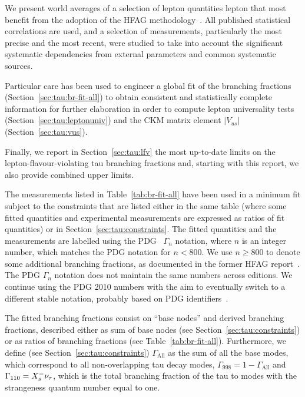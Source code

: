 We present world averages of a selection of \mtau lepton quantities lepton
that most benefit from the adoption of the HFAG
methodology~\cite{Asner:2010qj}.
All published statistical correlations are used, and a
selection of measurements, particularly the most precise and the most
recent, were studied to take into account the significant systematic
dependencies from external parameters and common systematic sources.

Particular care has been used to engineer a global fit of the \mtau
branching fractions (Section~\ref{sec:tau:br-fit-all}) to obtain consistent
and statistically complete information for further elaboration in order to
compute lepton universality tests (Section~\ref{sec:tau:leptonuniv}) and
the CKM matrix element $|V_{us}|$ (Section~\ref{sec:tau:vus}).

Finally, we report in Section~\ref{sec:tau:lfv} the most up-to-date limits
on the lepton-flavour-violating tau branching fractions and, starting with
this report, we also provide combined upper limits.

\label{sec:tau:br-fit-all}

The measurements listed in Table~\ref{tab:br-fit-all} have been used in a
minimum \chisq fit subject to the constraints that are listed
either in the same table (where some fitted quantities and experimental
measurements are expressed as ratios of fit quantities) or in
Section~\ref{sec:tau:constraints}. The fitted quantities and the measurements
are labelled using the PDG~\cite{PDG_2010} $\Gamma_{n}$ notation, where $n$ is
an integer number, which matches the PDG notation for $n<800$. We use
$n\ge 800$ to denote some additional branching fractions, as documented in the
former HFAG report~\cite{Asner:2010qj}. The PDG $\Gamma_{n}$ notation does
not maintain the same numbers across editions. We continue using the PDG
2010 numbers with the aim to eventually switch to a different stable notation,
probably based on PDG identifiers~\cite{pdg-identifiers-2014}.

The fitted branching fractions consist on \HfagTauBaseQuantNum ``base nodes'' and \HfagTauConstrNum derived
branching fractions, described either as sum of base nodes (see
Section~\ref{sec:tau:constraints}) or as ratios of branching fractions (see
Table~\ref{tab:br-fit-all}). Furthermore, we define (see
Section~\ref{sec:tau:constraints}) $\Gamma_{\text{All}}$ as the sum of all
the base modes, which correspond to all non-overlapping tau decay modes,
$\Gamma_{998} = 1 -\Gamma_{\text{All}}$ and $\Gamma_{110} =
\BRF{\tau^-}{X_s^- \nu_\tau}$, which is the total branching fraction of the
tau to modes with the strangeness quantum number equal to one.

